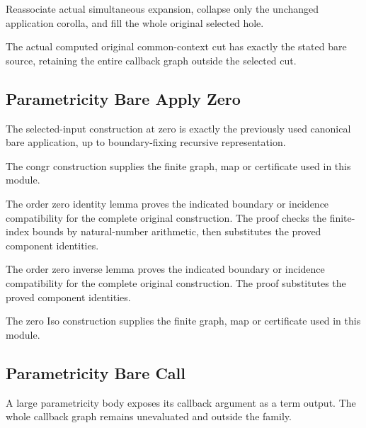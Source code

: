 Reassociate actual simultaneous expansion, collapse only the unchanged
application corolla, and fill the whole original selected hole.
\par{}

The actual computed original common-context cut has exactly the stated
bare source, retaining the entire callback graph outside the selected cut.
\par{}

\subsection{Parametricity Bare Apply Zero}
The selected-input construction at zero is exactly the previously used
canonical bare application, up to boundary-fixing recursive representation.

The congr construction supplies the finite graph, map or certificate used in this module.
\par{}

The order zero identity lemma proves the indicated boundary or incidence compatibility for the complete original construction.
The proof checks the finite-index bounds by natural-number arithmetic, then substitutes the proved component identities.
\par{}

The order zero inverse lemma proves the indicated boundary or incidence compatibility for the complete original construction.
The proof substitutes the proved component identities.
\par{}

The zero Iso construction supplies the finite graph, map or certificate used in this module.
\par{}

\subsection{Parametricity Bare Call}
A large parametricity body exposes its callback argument as a term
output. The whole callback graph remains unevaluated and outside the family.

